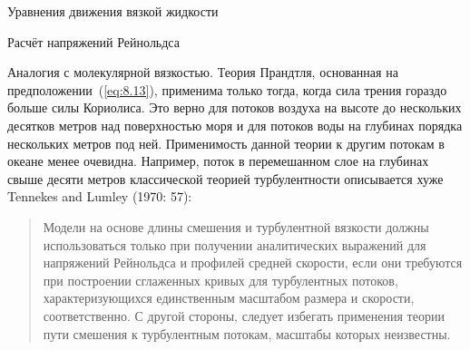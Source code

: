 \begin{chapter}{Уравнения движения вязкой жидкости}
\begin{section}{Расчёт напряжений Рейнольдса}
\begin{paragraph}{Аналогия с молекулярной вязкостью.}
Теория Прандтля, основанная на предположении~(\ref{eq:8.13}), применима 
только тогда, когда сила трения гораздо больше силы Кориолиса. 
Это верно для потоков воздуха на высоте до нескольких десятков метров 
над поверхностью моря и для потоков воды на глубинах порядка нескольких метров 
под ней. Применимость данной теории к другим потокам в океане менее очевидна. 
Например, поток в перемешанном слое 
на глубинах свыше десяти метров классической теорией турбулентности 
описывается хуже Tennekes and Lumley (1970: 57):
%
\begin{quotation}
Модели на основе длины смешения и турбулентной вязкости должны
использоваться только при получении аналитических выражений для
напряжений Рейнольдса и профилей средней скорости, если они требуются при
построении сглаженных кривых для турбулентных потоков, характеризующихся
единственным масштабом размера и скорости, соответственно. С другой стороны,
следует избегать применения теории пути смешения
к турбулентным потокам, масштабы которых неизвестны.
%
\end{quotation}


\end{paragraph}
\end{section}
\end{chapter}
